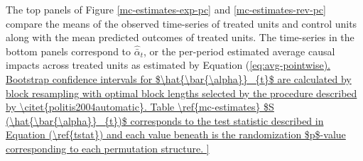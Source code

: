 \documentclass[12pt]{article}
\begin{document}
The top panels of Figure \ref{mc-estimates-exp-pc} and \ref{mc-estimates-rev-pc} compare the means of the observed time-series of treated units and control units along with the mean predicted outcomes of treated units. The time-series in the bottom panels correspond to $\hat{\bar{\alpha}}_{t}$, or the per-period estimated average causal impacts across treated units as estimated by Equation (\ref{eq:avg-pointwise). Bootstrap confidence intervals for $\hat{\bar{\alpha}}_{t}$ are calculated by block resampling with optimal block lengths selected by the procedure described by \citet{politis2004automatic}. 

Table \ref{mc-estimates} 
$S (\hat{\bar{\alpha}}_{t})$ corresponds to the test statistic described in Equation (\ref{tstat}) and each value beneath is the randomization $p$-value corresponding to each permutation structure.

}
\end{document}
